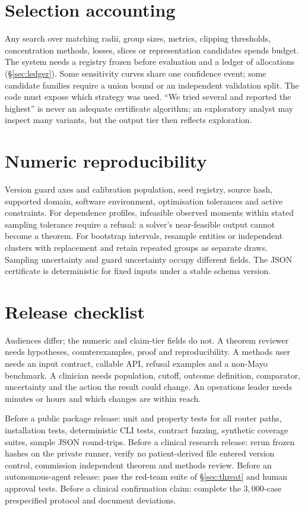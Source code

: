 \documentclass[11pt,a4paper]{article}
\theoremstyle{definition}
\theoremstyle{remark}
\begin{document}
\section{Selection accounting}\label{app:selection}

Any search over matching radii, group sizes, metrics, clipping thresholds, concentration methods, losses, slices or representation candidates spends budget. The system needs a registry frozen before evaluation and a ledger of allocations (\S\ref{sec:ledger}). Some sensitivity curves share one confidence event; some candidate families require a union bound or an independent validation split. The code must expose which strategy was used. ``We tried several and reported the highest'' is never an adequate certificate algorithm; an exploratory analyst may inspect many variants, but the output tier then reflects exploration.

\section{Numeric reproducibility}\label{app:numeric}

Version guard axes and calibration population, seed registry, source hash, supported domain, software environment, optimisation tolerances and active constraints. For dependence profiles, infeasible observed moments within stated sampling tolerance require a refusal: a solver's near-feasible output cannot become a theorem. For bootstrap intervals, resample entities or independent clusters with replacement and retain repeated groups as separate draws. Sampling uncertainty and guard uncertainty occupy different fields. The JSON certificate is deterministic for fixed inputs under a stable schema version.

\section{Release checklist}\label{app:release}

Audiences differ; the numeric and claim-tier fields do not. A theorem reviewer needs hypotheses, counterexamples, proof and reproducibility. A methods user needs an input contract, callable API, refusal examples and a non-Mayo benchmark. A clinician needs population, cutoff, outcome definition, comparator, uncertainty and the action the result could change. An operations leader needs minutes or hours and which changes are within reach.

Before a public package release: unit and property tests for all router paths, installation tests, deterministic CLI tests, contract fuzzing, synthetic coverage suites, sample JSON round-trips. Before a clinical research release: rerun frozen hashes on the private runner, verify no patient-derived file entered version control, commission independent theorem and methods review. Before an autonomous-agent release: pass the red-team suite of \S\ref{sec:threat} and human approval tests. Before a clinical confirmation claim: complete the $3{,}000$-case prespecified protocol and document deviations.
\end{document}
